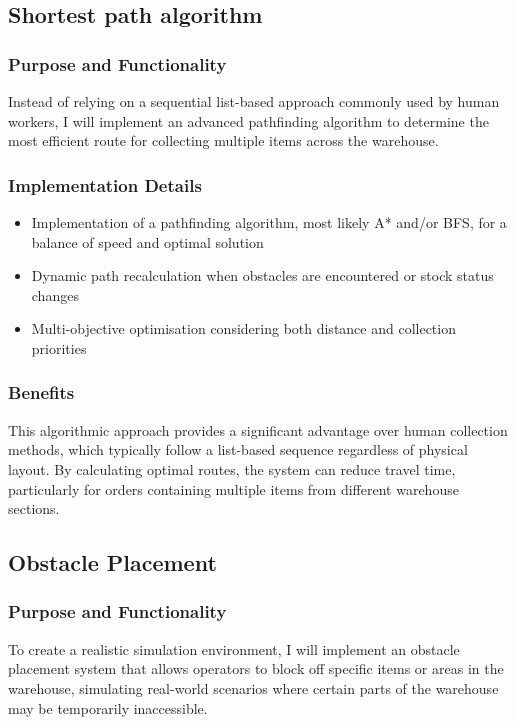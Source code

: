 \subsection{Shortest path algorithm}

\subsubsection{Purpose and Functionality}
Instead of relying on a sequential list-based approach commonly used by human workers, I will implement an advanced pathfinding algorithm to determine the most efficient route for collecting multiple items across the warehouse.

\subsubsection{Implementation Details}
\begin{itemize}
    \item Implementation of a pathfinding algorithm, most likely A* and/or BFS, for a balance of speed and optimal solution
    \item Dynamic path recalculation when obstacles are encountered or stock status changes
    \item Multi-objective optimisation considering both distance and collection priorities
\end{itemize}

\subsubsection{Benefits}
This algorithmic approach provides a significant advantage over human collection methods, which typically follow a list-based sequence regardless of physical layout. By calculating optimal routes, the system can reduce travel time, particularly for orders containing multiple items from different warehouse sections.

\subsection{Obstacle Placement}

\subsubsection{Purpose and Functionality}
To create a realistic simulation environment, I will implement an obstacle placement system that allows operators to block off specific items or areas in the warehouse, simulating real-world scenarios where certain parts of the warehouse may be temporarily inaccessible.

